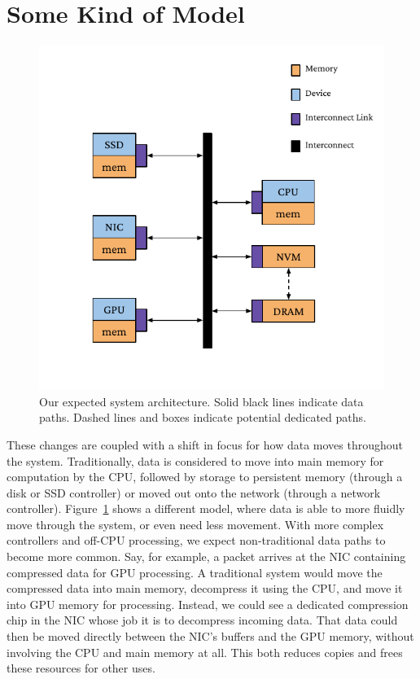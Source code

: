 \section{Some Kind of Model}
\begin{figure}
    \centering
    \includegraphics[width=\linewidth]{fig/gen_sys_diag}
    \caption{Our expected system architecture. Solid black lines indicate data paths. Dashed lines and boxes indicate potential dedicated paths.}
    \label{fig:sys_arch}
\end{figure}


These changes are coupled with a shift in focus for how data moves throughout the system.
Traditionally, data is considered to move into main memory for computation by the CPU, followed by
storage to persistent memory (through a disk or SSD controller) or moved out onto the network
(through a network controller). Figure~\ref{fig:sys_arch} shows a different model, where data is able to more
fluidly move
through the system, or even need less movement. With more complex controllers and off-CPU processing, we expect
non-traditional data paths to become more common. Say, for example, a packet arrives at the NIC
containing compressed data for GPU processing. A traditional system would move the compressed data
into main memory, decompress it using the CPU, and move it into GPU memory for processing. Instead,
we could see a dedicated compression chip in the NIC whose job it is to decompress incoming data.
That data could then be moved directly between the NIC's buffers and the GPU memory, without involving
the CPU and main memory at all. This both reduces copies and frees these
resources for other uses.

